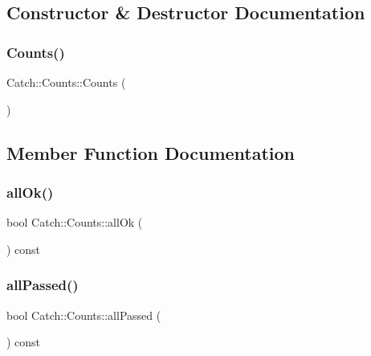 \subsection{Constructor \& Destructor Documentation}
\hypertarget{struct_catch_1_1_counts_aab9092ce70d4b0179cc743555d2fc39b}{}\label{struct_catch_1_1_counts_aab9092ce70d4b0179cc743555d2fc39b} 
\subsubsection{\texorpdfstring{Counts()}{Counts()}}
{\footnotesize\ttfamily Catch\+::\+Counts\+::\+Counts (\begin{DoxyParamCaption}{ }\end{DoxyParamCaption})\hspace{0.3cm}{\ttfamily [inline]}}



\subsection{Member Function Documentation}
\hypertarget{struct_catch_1_1_counts_a33bd996e016030155b99fe1c51c08991}{}\label{struct_catch_1_1_counts_a33bd996e016030155b99fe1c51c08991} 
\subsubsection{\texorpdfstring{all\+Ok()}{allOk()}}
{\footnotesize\ttfamily bool Catch\+::\+Counts\+::all\+Ok (\begin{DoxyParamCaption}{ }\end{DoxyParamCaption}) const\hspace{0.3cm}{\ttfamily [inline]}}

\hypertarget{struct_catch_1_1_counts_a84999490e0ecaa3de5e121bf48eda1b3}{}\label{struct_catch_1_1_counts_a84999490e0ecaa3de5e121bf48eda1b3} 
\subsubsection{\texorpdfstring{all\+Passed()}{allPassed()}}
{\footnotesize\ttfamily bool Catch\+::\+Counts\+::all\+Passed (\begin{DoxyParamCaption}{ }\end{DoxyParamCaption}) const\hspace{0.3cm}{\ttfamily [inline]}}

